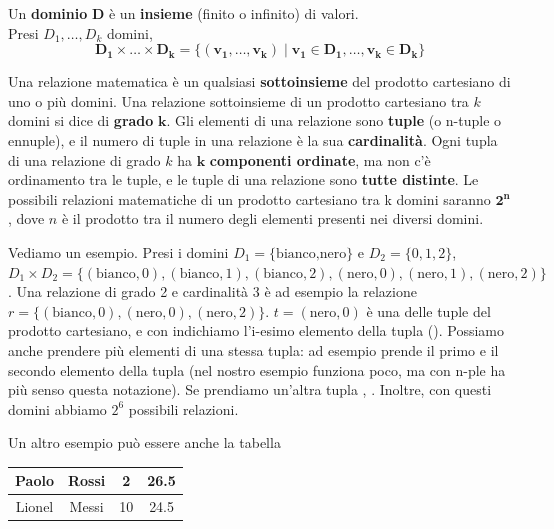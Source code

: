 \documentclass[11pt, a4paper, titlepage, oneside]{scrbook}
\begin{document}
\begin{Definizione}[Dominio]
\label{def-dominio}
Un \textbf{dominio} $\bm{D}$ è un \textbf{insieme} (finito o infinito) di valori. \\
Presi $D_1, \ldots, D_k$ domini, 
\[
\bm{D_1 \times \ldots \times D_k = \{(v_1,\ldots, v_k) \mid v_1 \in D_1, \ldots, v_k \in D_k\}}
\]
\end{Definizione}

\begin{Definizione}
\label{def-relazioni-matematiche}
Una relazione matematica è un qualsiasi \textbf{sottoinsieme} del prodotto cartesiano di uno o più domini. Una relazione sottoinsieme di un prodotto cartesiano tra $k$ domini si dice di \textbf{grado} $\bm{k}$. Gli elementi di una relazione sono \textbf{tuple} (o n-tuple o ennuple), e il numero di tuple in una relazione è la sua \textbf{cardinalità}. Ogni tupla di una relazione di grado $k$ ha $\bm{k}$ \textbf{componenti ordinate}, ma non c'è ordinamento tra le tuple, e le tuple di una relazione sono \textbf{tutte distinte}. Le possibili relazioni matematiche di un prodotto cartesiano tra k domini saranno $\bm{2^n}$, dove $n$ è il prodotto tra il numero degli elementi presenti nei diversi domini.
\end{Definizione}

Vediamo un esempio. Presi i domini $D_1 = \{\text{bianco,nero}\}$ e $D_2 = \{0,1,2\}$, \mbox{$D_1 \times D_2 = \{(\text{bianco}, 0), (\text{bianco}, 1), (\text{bianco}, 2), (\text{nero}, 0),(\text{nero}, 1),(\text{nero}, 2)\}$}. Una relazione di grado 2 e cardinalità 3 è ad esempio la relazione $r = \{(\text{bianco}, 0), (\text{nero}, 0), (\text{nero}, 2)\}$. $t = (\text{nero}, 0)$ è una delle tuple del prodotto cartesiano, e con  indichiamo l'i-esimo elemento della tupla (). Possiamo anche prendere più elementi di una stessa tupla: ad esempio  prende il primo e il secondo elemento della tupla (nel nostro esempio funziona poco, ma con n-ple ha più senso questa notazione). Se prendiamo un'altra tupla , . Inoltre, con questi domini abbiamo $2^6$ possibili relazioni.

Un altro esempio può essere anche la tabella

\begin{center}
\begin{tabular}{|c|c|c|c|}
\hline
Paolo & Rossi & 2 & 26.5 \\
\hline
Lionel & Messi & 10 & 24.5 \\
\hline
\end{tabular}
\end{center}
\end{document}

